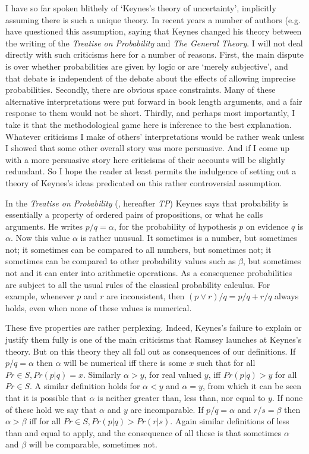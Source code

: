 I have so far spoken blithely of `Keynes's theory of uncertainty', implicitly assuming there is such a unique theory. In recent years a number of authors (e.g. \citet{Runde1994a, Davis1994, Coates1996, Bateman1996} have questioned this assumption, saying that Keynes changed his theory between the writing of the \textit{Treatise on Probability} and \textit{The General Theory}. I will not deal directly with such criticisms here for a number of reasons. First, the main dispute is over whether probabilities are given by logic or are `merely subjective', and that debate is independent of the debate about the effects of allowing imprecise probabilities. Secondly, there are obvious space constraints. Many of these alternative interpretations were put forward in book length arguments, and a fair response to them would not be short. Thirdly, and perhaps most importantly, I take it that the methodological game here is inference to the best explanation. Whatever criticisms I make of others' interpretations would be rather weak unless I showed that some other overall story was more persuasive. And if I come up with a more persuasive story here criticisms of their accounts will be slightly redundant. So I hope the reader at least permits the indulgence of setting out a theory of Keynes's ideas predicated on this rather controversial assumption.

In the \textit{Treatise on Probability} (\citet{Keynes1921}, hereafter \textit{TP}) Keynes says that probability is essentially a property of ordered pairs of propositions, or what he calls arguments. He writes \(p / q = \alpha\), for the probability of hypothesis \(p\) on evidence \(q\) is \(\alpha\). Now this value \(\alpha\) is rather unusual. It sometimes is a number, but sometimes not; it sometimes can be compared to all numbers, but sometimes not; it sometimes can be compared to other probability values such as \(\beta\), but sometimes not and it can enter into arithmetic operations. As a consequence probabilities are subject to all the usual rules of the classical probability calculus. For example, whenever \(p\) and \(r\) are inconsistent, then \((p \vee r) / q = p / q + r / q\) always holds, even when none of these values is numerical.

These five properties are rather perplexing. Indeed, Keynes's failure to explain or justify them fully is one of the main criticisms that Ramsey \cite[161-6]{RamseyTruthProb} launches at Keynes's theory. But on this theory they all fall out as consequences of our definitions. If \(p/q = \alpha\) then \(\alpha\) will be numerical iff there is some \(x\) such that for all \(Pr \in S, Pr(p | q) = x\). Similarly \(\alpha > y\), for real valued \(y\), iff \(Pr(p | q) > y\) for all \(Pr \in S\). A similar definition holds for \(\alpha < y\) and \(\alpha = y\), from which it can be seen that it is possible that \(\alpha\) is neither greater than, less than, nor equal to \(y\). If none of these hold we say that \(\alpha\) and \(y\) are incomparable. If \(p / q = \alpha\) and \(r / s = \beta\) then \(\alpha > \beta\) iff for all \(Pr \in S, Pr(p | q) > Pr(r | s)\). Again similar definitions of less than and equal to apply, and the consequence of all these is that sometimes \(\alpha\) and \(\beta\) will be comparable, sometimes not.

